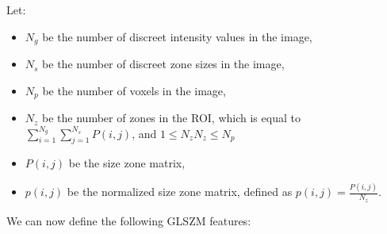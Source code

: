 Let:
\begin{itemize}
\item $N_{g}$ be the number of discreet intensity values in the image, 
\item $N_{s}$ be the number of discreet zone sizes in the image,
\item $N_{p}$ be the number of voxels in the image,
\item $N_{z}$ be the number of zones in the ROI, which is equal to $\sum _{i=1}^{N_{g}}\sum _{j=1}^{N_{s}}P\left(i,j\right)$, and $1\leq N_{z}N_{z}\leq N_{p}$
\item $P\left(i,j\right)$ be the size zone matrix,
\item $p\left(i,j\right)$ be the normalized size zone matrix, defined as $p\left(i,j\right)=\frac{P\left(i,j\right)}{N_{z}}$.
\end{itemize}
We can now define the following GLSZM features:

